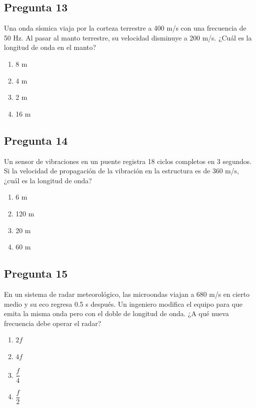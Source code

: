 \begin{preguntabox}
\section{Pregunta 13}
Una onda sísmica viaja por la corteza terrestre a 400 m/s con una frecuencia de 50 Hz. Al pasar al manto terrestre, su velocidad disminuye a 200 m/s. ¿Cuál es la longitud de onda en el manto?

\begin{enumerate}
    \item[A)] 8 m
    \item[B)] 4 m
    \item[C)] 2 m
    \item[D)] 16 m
\end{enumerate}
\end{preguntabox}
\newpage
\begin{preguntabox}
\section{Pregunta 14}
Un sensor de vibraciones en un puente registra 18 ciclos completos en 3 segundos. Si la velocidad de propagación de la vibración en la estructura es de 360 m/s, ¿cuál es la longitud de onda?

\begin{enumerate}
    \item[A)] 6 m
    \item[B)] 120 m
    \item[C)] 20 m
    \item[D)] 60 m
\end{enumerate}
\end{preguntabox}

\begin{preguntabox}
\section{Pregunta 15}
En un sistema de radar meteorológico, las microondas viajan a 680 m/s en cierto medio y su eco regresa 0.5 s después. Un ingeniero modifica el equipo para que emita la misma onda pero con el doble de longitud de onda. ¿A qué nueva frecuencia debe operar el radar?

\begin{enumerate}
    \item[A)] $2f$
    \item[B)] $4f$
    \item[C)] $\dfrac{f}{4}$
    \item[D)] $\dfrac{f}{2}$
\end{enumerate}
\end{preguntabox}

